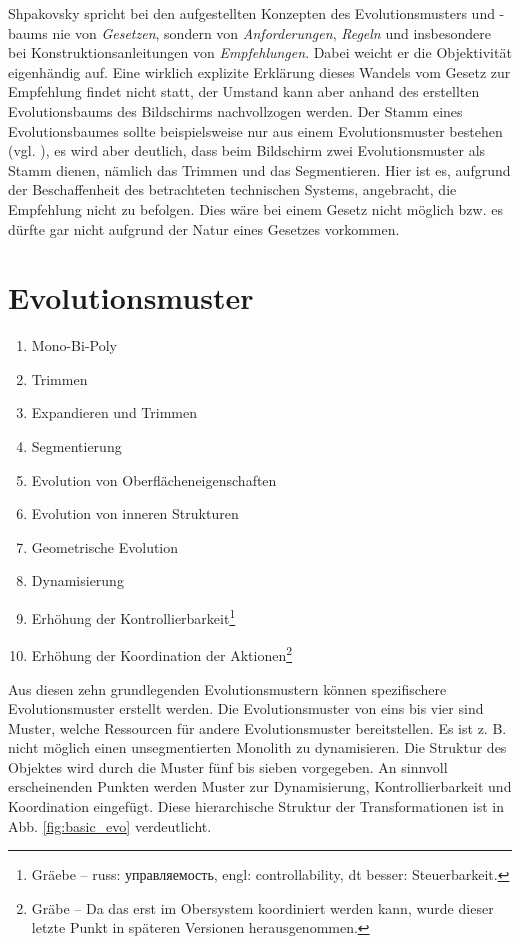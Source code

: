 \documentclass[11pt,a4paper]{article}
\begin{document}
Shpakovsky spricht bei den aufgestellten Konzepten des Evolutionsmusters und
-baums nie von \emph{Gesetzen}, sondern von \emph{Anforderungen},
\emph{Regeln} und insbesondere bei Konstruktionsanleitungen von
\emph{Empfehlungen}.  Dabei weicht er die Objektivität eigenhändig auf. Eine
wirklich explizite Erklärung dieses Wandels vom Gesetz zur Empfehlung findet
nicht statt, der Umstand kann aber anhand des erstellten Evolutionsbaums des
Bildschirms nachvollzogen werden.  Der Stamm eines Evolutionsbaumes sollte
beispielsweise nur aus einem Evolutionsmuster bestehen
(vgl. \cite[S. 122f]{evo}), es wird aber deutlich, dass beim Bildschirm zwei
Evolutionsmuster als Stamm dienen, nämlich das Trimmen und das Segmentieren.
Hier ist es, aufgrund der Beschaffenheit des betrachteten technischen Systems,
angebracht, die Empfehlung nicht zu befolgen. Dies wäre bei einem Gesetz nicht
möglich bzw. es dürfte gar nicht aufgrund der Natur eines Gesetzes vorkommen.

\section{Evolutionsmuster}

\begin{enumerate}[noitemsep]
\item Mono-Bi-Poly
\item Trimmen
\item Expandieren und Trimmen
\item Segmentierung
\item Evolution von Oberflächeneigenschaften
\item Evolution von inneren Strukturen
\item Geometrische Evolution
\item Dynamisierung
\item Erhöhung der Kontrollierbarkeit\footnote{Gräebe -- russ:
  \foreignlanguage{russian}{управляемость}, engl: controllability, dt besser:
  Steuerbarkeit.} 
\item Erhöhung der Koordination der Aktionen\footnote{Gräbe -- Da das erst im
  Obersystem koordiniert werden kann, wurde dieser letzte Punkt in späteren
  Versionen herausgenommen.}
\end{enumerate}

Aus diesen zehn grundlegenden Evolutionsmustern können spezifischere
Evolutionsmuster erstellt werden. Die Evolutionsmuster von eins bis vier sind
Muster, welche Ressourcen für andere Evolutionsmuster bereitstellen. Es ist
z. B. nicht möglich einen unsegmentierten Monolith zu dynamisieren. Die
Struktur des Objektes wird durch die Muster fünf bis sieben vorgegeben. An
sinnvoll erscheinenden Punkten werden Muster zur Dynamisierung,
Kontrollierbarkeit und Koordination eingefügt. Diese hierarchische Struktur
der Transformationen ist in Abb. \ref{fig:basic_evo} verdeutlicht.
\end{document}
